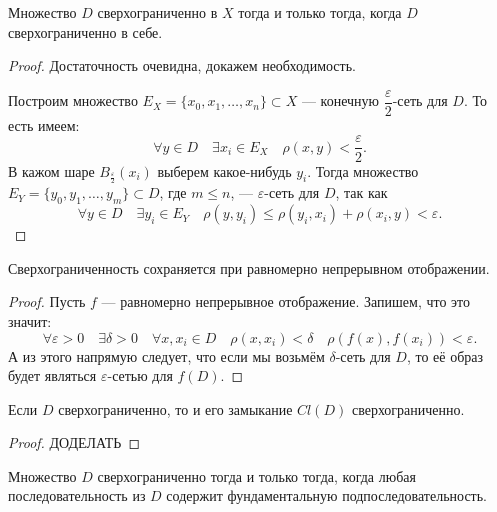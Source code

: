\begin{lemma}
	Множество \(D\) сверхограниченно в \(X\) тогда и только тогда, когда \(D\) сверхограниченно в себе.
\end{lemma}

\begin{proof}
	Достаточность очевидна, докажем необходимость.
	
	Построим множество \(E_X = \{x_0, x_1,\ldots, x_n\} \subset X\) --- конечную \(\dfrac{\varepsilon}{2}\)-сеть для \(D\). То есть имеем: \[
	\forall y \in D \quad \exists x_i \in E_X \quad \rho(x, y) < \frac{\varepsilon}{2}.
	\]
	В кажом шаре \(B_{\frac{\varepsilon}{2}} (x_i)\) выберем какое-нибудь \(y_i\). Тогда множество \linebreak \(E_Y = \{y_0, y_1,\ldots, y_m\} \subset D\), где \(m \leqslant n\), --- \(\varepsilon\)-сеть для \(D\), так как \[
	\forall y \in D \quad \exists y_i \in E_Y \quad \rho(y, y_i) \leqslant \rho(y_i, x_i) + \rho(x_i, y) < \varepsilon.
	\]
\end{proof}

\begin{lemma}
	Сверхограниченность сохраняется при равномерно непрерывном отображении.
\end{lemma}

\begin{proof}
	Пусть \(f\) --- равномерно непрерывное отображение. Запишем, что это значит: \[
	\forall \varepsilon > 0 \quad \exists \delta > 0 \quad \forall x, x_i \in D \quad \rho(x, x_i) < \delta \quad \rho(f(x), f(x_i)) < \varepsilon.
	\]
	А из этого напрямую следует, что если мы возьмём \(\delta\)-сеть для \(D\), то её образ будет являться \(\varepsilon\)-сетью для \(f(D)\).
\end{proof}

\begin{lemma}
	Если \(D\) сверхограниченно, то и его замыкание \(Cl(D)\) сверхограниченно.
\end{lemma}

\begin{proof}
	ДОДЕЛАТЬ
\end{proof}

\begin{lemma}
	Множество \(D\) сверхограниченно тогда и только тогда, когда любая последовательность из \(D\) содержит фундаментальную подпоследовательность.
\end{lemma}

